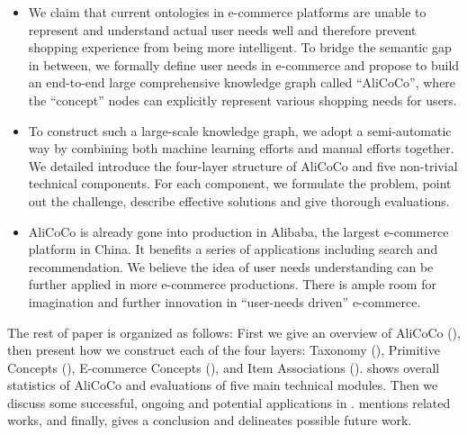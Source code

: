\begin{itemize}
	\item We claim that current ontologies in e-commerce platforms are unable to represent and understand actual user needs well and therefore prevent shopping experience from being more intelligent. To bridge the semantic gap in between, we formally define user needs in e-commerce and propose to build an end-to-end large comprehensive knowledge graph called ``AliCoCo'', where the ``concept'' nodes can explicitly represent various shopping needs for users.
	\item To construct such a large-scale knowledge graph, we adopt a semi-automatic way by combining both machine learning efforts and manual efforts together. We detailed introduce the four-layer structure of AliCoCo and five non-trivial technical components. For each component, we formulate the problem, point out the challenge, describe effective solutions and give thorough evaluations.
	\item AliCoCo is already gone into production in Alibaba, the largest e-commerce platform in China. It benefits a series of applications including search and recommendation.
	We believe the idea of user needs understanding can be further applied in more e-commerce productions. There is ample room for imagination and further innovation in ``user-needs driven'' e-commerce.
\end{itemize}

The rest of paper is organized as follows:
First we give an overview
of AliCoCo (), then present how we construct each of the four layers:
Taxonomy (), Primitive Concepts (), E-commerce Concepts (), and Item Associations ().
 shows overall statistics of AliCoCo and evaluations of five main technical modules.
Then we discuss some successful, ongoing and potential applications in .
 mentions related works, and finally,  gives a conclusion and delineates possible future work.
